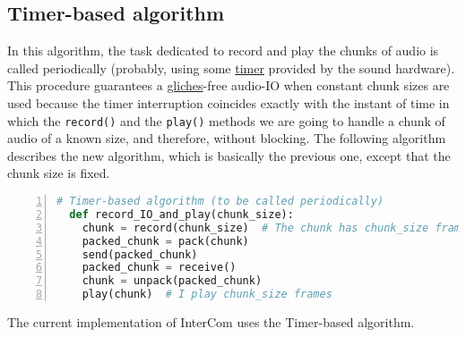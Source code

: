 \subsection{Timer-based algorithm}

In this algorithm, the task dedicated to record and play the chunks of
audio is called periodically (probably, using some
\href{https://en.wikipedia.org/wiki/Timer}{timer} provided by the
sound hardware). This procedure guarantees a
\href{https://en.wikipedia.org/wiki/Glitch}{gliches}-free audio-IO
when constant chunk sizes are used because the timer interruption
coincides exactly with the instant of time in which the
\verb|record()| and the \verb|play()| methods we are going to handle a
chunk of audio of a known size, and therefore, without blocking. The following
algorithm describes the new algorithm, which is basically the previous
one, except that the chunk size is fixed.

\begin{lstlisting}[language=Python,numbers=left]
  # Timer-based algorithm (to be called periodically)
  def record_IO_and_play(chunk_size):
    chunk = record(chunk_size)  # The chunk has chunk_size frames
    packed_chunk = pack(chunk)
    send(packed_chunk)
    packed_chunk = receive()
    chunk = unpack(packed_chunk)
    play(chunk)  # I play chunk_size frames
\end{lstlisting}


The current implementation of InterCom uses the Timer-based algorithm.

